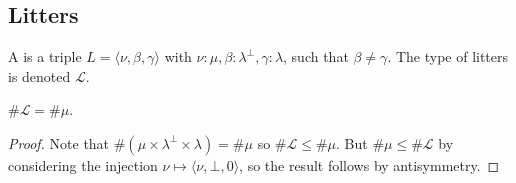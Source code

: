 \subsection{Litters}

\begin{definition}
    A  is a triple \( L = \langle \nu, \beta, \gamma \rangle \) with \( \nu : \mu, \beta : \lambda^\bot, \gamma : \lambda \), such that \( \beta \neq \gamma \).
    The type of litters is denoted \( \mathcal L \).
\end{definition}
\begin{lemma}
    \label{lem:mk_litter}
    \( \#\mathcal L = \#\mu \).
\end{lemma}
\begin{proof}
    Note that \( \#(\mu \times \lambda^\bot \times \lambda) = \#\mu \) so \( \#\mathcal L \leq \#\mu \).
    But \( \#\mu \leq \#\mathcal L \) by considering the injection \( \nu \mapsto \langle \nu, \bot, 0 \rangle \), so the result follows by antisymmetry.
\end{proof}
